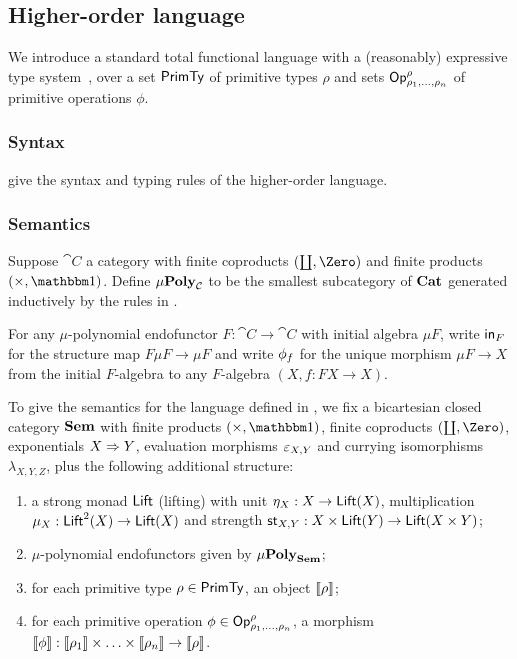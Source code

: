 \subsection{Higher-order language}

We introduce a standard total functional language with a (reasonably) expressive type
system~\cite{crole94,pitts01,santocanale02}, over a set $\mathsf{PrimTy}$ of primitive types $\rho$ and sets
$\mathsf{Op}^\rho_{\rho_1,\ldots,\rho_n}$ of primitive operations $\phi$.

\subsubsection{Syntax}
\label{sec:language:syntax}




 give the syntax and typing rules of the higher-order language.

\subsubsection{Semantics}
\label{sec:language:semantics}




\begin{definition}[$\mu$-polynomial]
Suppose $\cat{C}$ a category with finite coproducts $(\coprod, \Zero)$ and finite products $(\times, \One)$.
Define $\mu\mathbf{Poly}_{\mathcal{C}}$ to be the smallest subcategory of $\mathbf{Cat}$ generated inductively by the rules in
.
\end{definition}

For any $\mu$-polynomial endofunctor $F: \cat{C} \to \cat{C}$ with initial algebra $\mu F$, write $\mathsf{in}_F$
for the structure map $F\mu F \to \mu F$ and write $\phi_f$ for the unique morphism $\mu F \to X$ from the
initial $F$-algebra to any $F$-algebra $(X, f: FX \to X)$.

To give the semantics for the language defined in , we fix a bicartesian closed
category $\mathbf{Sem}$ with finite products $(\times, \One)$, finite coproducts $(\coprod, \Zero)$, exponentials
$X \Rightarrow Y$, evaluation morphisms $\varepsilon_{X,Y}$ and currying isomorphisms $\lambda_{X,Y,Z}$, plus the
following additional structure:
\begin{enumerate}
\item a strong monad $\mathsf{Lift}$ (lifting) with unit $\eta_X: X \to \mathsf{Lift}(X)$, multiplication $\mu_X: \mathsf{Lift}^2(X)
\to \mathsf{Lift}(X)$ and strength $\mathsf{st}_{X,Y}: X \times \mathsf{Lift}(Y) \to \mathsf{Lift}(X \times Y)$;
\item $\mu$-polynomial endofunctors given by $\mu\mathbf{Poly}_{\mathbf{Sem}}$;
\item for each primitive type $\rho \in \mathsf{PrimTy}$, an object $\llbracket \rho \rrbracket$;
\item for each primitive operation $\phi \in \mathsf{Op}^\rho_{\rho_1,\ldots,\rho_n}$, a morphism $\llbracket \phi \rrbracket:
\llbracket \rho_1 \rrbracket \times \ldots \times \llbracket \rho_n \rrbracket \to \llbracket \rho \rrbracket$.
\end{enumerate}

